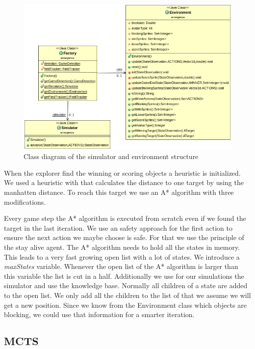 \begin{figure}
\centering
\includegraphics[scale=0.5]{images/classes.png}
\caption{Class diagram of the simulator and environment structure}
\label{fig:sim_classes}
\end{figure}


When the explorer find the winning or scoring objects a heuristic is initialized. We used a heuristic with that 
calculates the distance to one target by using the manhatten distance. To reach this target we use an A* 
algorithm with three modifications.

Every game step the A* algorithm is executed from scratch even if we found the target in the last iteration.
We use an safety approach for the first action to ensure the next action we maybe choose is safe. For that we
use the principle of the stay alive agent. The A* algorithm needs to hold all the states in memory.
This leads to a very fast growing open list with a lot of states. We introduce a \textit{maxStates} variable. 
Whenever the open list of the A* algorithm is larger than this variable the list is cut in a half.
Additionally we use for our simulations the simulator and use the knowledge base. Normally all children of
a state are added to the open list. We only add all the children to the list of that we assume we will get a 
new position. Since we know from the Environment class which objects are blocking, we could use that information
for a smarter iteration.


\subsection{MCTS} 

